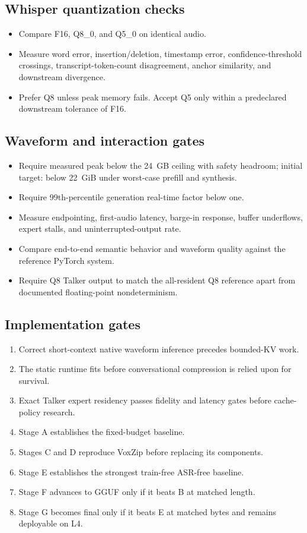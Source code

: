 \documentclass[10pt,letterpaper]{article}
\begin{document}
\subsection{Whisper quantization checks}
\begin{itemize}
    \item Compare F16, Q8\_0, and Q5\_0 on identical audio.
    \item Measure word error, insertion/deletion, timestamp error, confidence-threshold crossings, transcript-token-count disagreement, anchor similarity, and downstream divergence.
    \item Prefer Q8 unless peak memory fails. Accept Q5 only within a predeclared downstream tolerance of F16.
\end{itemize}

\subsection{Waveform and interaction gates}
\begin{itemize}
    \item Require measured peak below the 24~GB ceiling with safety headroom; initial target: below 22~GiB under worst-case prefill and synthesis.
    \item Require 99th-percentile generation real-time factor below one.
    \item Measure endpointing, first-audio latency, barge-in response, buffer underflows, expert stalls, and uninterrupted-output rate.
    \item Compare end-to-end semantic behavior and waveform quality against the reference PyTorch system.
    \item Require Q8 Talker output to match the all-resident Q8 reference apart from documented floating-point nondeterminism.
\end{itemize}

\subsection{Implementation gates}
\begin{enumerate}
    \item Correct short-context native waveform inference precedes bounded-KV work.
    \item The static runtime fits before conversational compression is relied upon for survival.
    \item Exact Talker expert residency passes fidelity and latency gates before cache-policy research.
    \item Stage A establishes the fixed-budget baseline.
    \item Stages C and D reproduce VoxZip before replacing its components.
    \item Stage E establishes the strongest train-free ASR-free baseline.
    \item Stage F advances to GGUF only if it beats B at matched length.
    \item Stage G becomes final only if it beats E at matched bytes and remains deployable on L4.
\end{enumerate}
\end{document}
